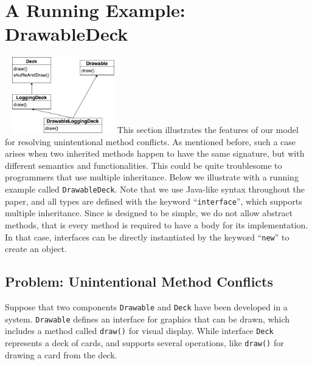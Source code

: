 \section{A Running Example: DrawableDeck}~\label{sec:overview}
\includegraphics[height=3.3cm]{pics/DrawableLoggingDeck.pdf}
This section illustrates the features of our \MIM{} model for resolving unintentional method
conflicts. As mentioned before, such a case arises when two inherited methods happen to have the
same signature, but with different semantics and functionalities. This could be quite troublesome
to programmers that use multiple inheritance. Below we illustrate with a running example called \lstinline|DrawableDeck|.
Note that we use Java-like syntax throughout the paper, and all types are defined with the keyword ``\lstinline|interface|'', which
supports multiple inheritance. Since \MIM{} is designed to be simple, we do not allow abstract methods, that is every method
is required to have a body for its implementation. In that case, interfaces can be directly instantiated by the keyword ``\lstinline|new|''
to create an object. 

\subsection{Problem: Unintentional Method Conflicts}

Suppose that two components \lstinline|Drawable| and \lstinline|Deck| have been developed in a system.
\lstinline|Drawable| defines an interface for graphics that can be drawn, which includes a method called \lstinline|draw()|
for visual display. While interface \lstinline|Deck| represents a deck of cards, and supports several operations, like
\lstinline|draw()| for drawing a card from the deck.

